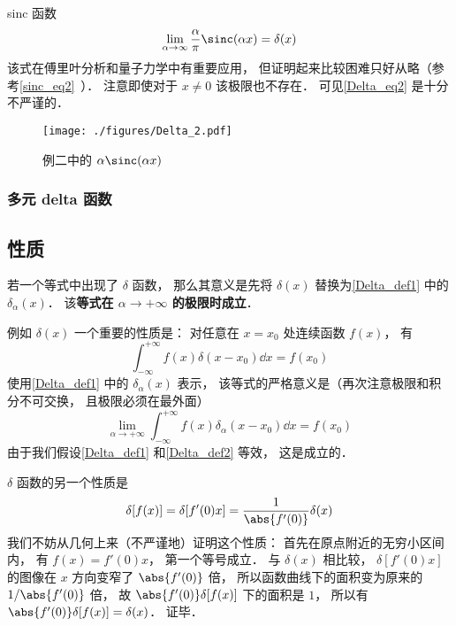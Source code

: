 \begin{example}{sinc 函数}
\begin{equation}\label{Delta_eq10}
\lim_{\alpha\to\infty}\frac{\alpha}{\pi}\sinc(\alpha x) = \delta(x)
\end{equation}
该式在傅里叶分析和量子力学中有重要应用， 但证明起来比较困难只好从略（参考\autoref{sinc_eq2}~）． 注意即使对于 $x \ne 0$ 该极限也不存在． 可见\autoref{Delta_eq2} 是十分不严谨的．
\end{example}
\begin{figure}[ht]
\centering
\texttt{[image: ./figures/Delta\_2.pdf]}
\caption{例二中的 $\alpha\sinc(\alpha x)$} \label{Delta_fig2}
\end{figure}

\subsubsection{多元 delta 函数}

\subsection{性质}
若一个等式中出现了 $\delta$ 函数， 那么其意义是先将 $\delta(x)$ 替换为\autoref{Delta_def1} 中的 $\delta_\alpha(x)$． 该\textbf{等式在 $\alpha\to+\infty$ 的极限时成立}．

例如 $\delta(x)$ 一个重要的性质是： 对任意在 $x = x_0$ 处连续函数 $f(x)$， 有
\begin{equation}\label{Delta_eq7}
\int_{-\infty}^{+\infty} f(x) \delta(x - x_0) \dd{x}= f(x_0)
\end{equation}
使用\autoref{Delta_def1} 中的 $\delta_\alpha(x)$ 表示， 该等式的严格意义是（再次注意极限和积分不可交换， 且极限必须在最外面）
\begin{equation}\label{Delta_eq11}
\lim_{\alpha\to+\infty}\int_{-\infty}^{+\infty} f(x) \delta_\alpha(x - x_0) \dd{x}= f(x_0)
\end{equation}
由于我们假设\autoref{Delta_def1} 和\autoref{Delta_def2} 等效， 这是成立的．

$\delta$ 函数的另一个性质是
\begin{equation}
\delta[f(x)] = \delta[f'(0)x] = \frac{1}{\abs{f'(0)}} \delta(x)
\end{equation}
我们不妨从几何上来（不严谨地）证明这个性质： 首先在原点附近的无穷小区间内， 有 $f(x) = f'(0)x$， 第一个等号成立． 与 $\delta(x)$ 相比较， $\delta[f'(0)x]$ 的图像在 $x$ 方向变窄了 $\abs{f'(0)}$ 倍， 所以函数曲线下的面积变为原来的 $1/\abs{f'(0)}$ 倍， 故 $\abs{f'(0)}\delta[f(x)]$ 下的面积是 $1$， 所以有 $\abs{f'(0)}\delta[f(x)] = \delta(x)$． 证毕．

